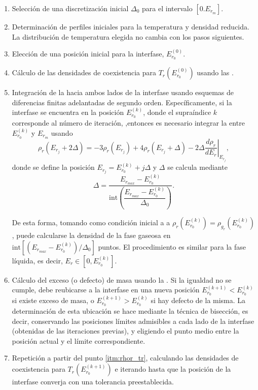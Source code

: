 \begin{enumerate}

\item Selecci\'on de una discretizaci\'on inicial $\Delta_0$ para el intervalo $[0.E_{r_m}]$.

\item Determinaci\'on de perfiles iniciales para la temperatura y densidad reducida. La distribuci\'on de temperatura elegida no cambia con los pasos siguientes.

\item Elecci\'on de una posici\'on inicial para la interfase, $E_{r_0}^{(0)}$.

\item \label{itm:rhor_tr} C\'alculo de las densidades de coexistencia para $T_r(E_{r_0}^{(0)})$ usando las .

\item Integraci\'on de la  hacia ambos lados de la interfase usando esquemas de diferencias finitas adelantadas de segundo orden. Espec\'ificamente, si la interfase se encuentra en la posici\'on $E_{r_0}^{(k)}$, donde el supra\'indice $k$ corresponde al n\'umero de iteraci\'on, ,entonces es necesario integrar la  entre $E_{r_0}^{(k)}$ y $E_{r_m}$ usando
\begin{equation}
	\rho_r(E_{r_j} + 2\Delta) = -3\rho_r(E_{r_j}) + 4\rho_r(E_{r_j} + \Delta) - 2\Delta \left.\dfrac{d \rho_r}{d E_r} \right|_{E_{r_j}},
\end{equation}
donde se define la posici\'on $E_{r_j} = E_{r_0}^{(k)} + j\Delta$ y $\Delta$ se calcula mediante
\begin{equation}
	\Delta = \dfrac{E_{r_{max}} - E_{r_0}^{(k)}}{\mbox{int} \left( \dfrac{E_{r_{max}} - E_{r_0}^{(k)}}{\Delta_0} \right)}.
\end{equation}

De esta forma, tomando como condici\'on inicial a a $\rho_r(E_{r_0}^{(k)}) = \rho_{g_r}(E_{r_0}^{(k)})$, puede calcularse la densidad de la fase gaseosa en $\mbox{int}[ (E_{r_{max}} - E_{r_0}^{(k)} )/\Delta_0 ]$ puntos. El procedimiento es similar para la fase l\'iquida, es decir, $E_r \in [0,E_{r_0}^{(k)}]$.

\item C\'alculo del exceso (o defecto) de masa usando la . Si la igualdad no se cumple, debe reubicarse a la interfase en una nueva posici\'on $E_{r_0}^{(k+1)} < E_{r_0}^{(k)}$ si existe exceso de masa, o $E_{r_0}^{(k+1)} > E_{r_0}^{(k)}$ si hay defecto de la misma. La determinaci\'on de esta ubicaci\'on se hace mediante la t\'ecnica de bisecci\'on, es decir, conservando las posiciones l\'imites admisibles a cada lado de la interfase (obtenidas de las iteraciones previas), y eligiendo el punto medio entre la posici\'on actual y el l\'imite correspondiente.

\item Repetici\'on a partir del punto \ref{itm:rhor_tr}, calculando las densidades de coexistencia para $T_r(E_{r_0}^{(k+1)})$ e iterando hasta que la posici\'on de la interfase converja con una tolerancia preestablecida.

\end{enumerate}


